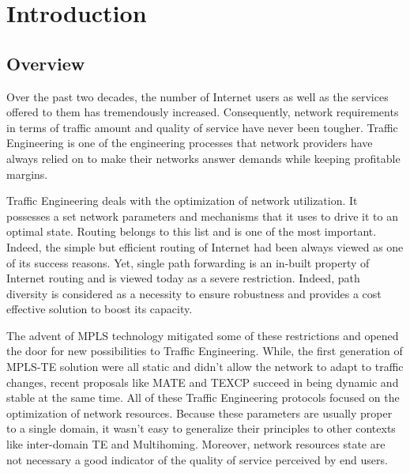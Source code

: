 \chapter{Introduction}
\label{chapter:intro}

\section{Overview}     %

Over the past two decades, the number of Internet users as well as the services offered to them has tremendously increased. Consequently, network requirements in terms of traffic amount and  quality of service have never been tougher. Traffic Engineering is one of the engineering processes that network providers have always relied on to make their networks answer demands while keeping profitable margins. 

Traffic Engineering deals with the optimization of network utilization. It possesses a set network parameters and mechanisms that it uses to drive it to an optimal state. Routing belongs to this list and is one of the most important. Indeed, the simple but efficient routing of Internet had been always viewed as one of its success reasons. Yet, single path forwarding is an in-built property of Internet routing and is viewed today as a severe restriction. Indeed, path diversity is considered as a necessity to ensure robustness  and provides a cost effective solution to boost its capacity.

The advent of MPLS technology mitigated some of these restrictions and opened the door for new possibilities to Traffic Engineering. While, the first generation of MPLS-TE solution were all static and didn't allow the network to adapt to traffic changes, recent proposals like MATE and TEXCP succeed in being dynamic and stable at the same time. All of these Traffic Engineering protocols focused on the optimization of network resources. Because these parameters are usually proper to a single domain, it wasn't easy to generalize their principles to other contexts like inter-domain TE and Multihoming. Moreover, network resources state are not necessary a good indicator of the quality of service perceived by end users.

